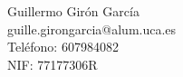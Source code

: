 Guillermo Gir\'on Garc\'ia \\ %
guille.girongarcia@alum.uca.es \\ %
Teléfono: 607984082 \\ %
NIF: 77177306R \\ %
